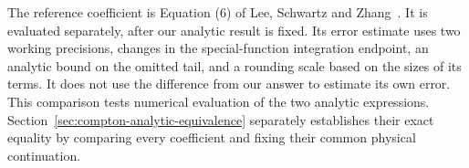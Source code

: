 The reference coefficient is Equation (6) of Lee, Schwartz and
Zhang~\cite{qed-processes-lsz}. It is evaluated separately, after
our analytic result is fixed. Its error estimate uses two working
precisions, changes in the special-function integration endpoint,
an analytic bound on the omitted tail, and a rounding scale based
on the sizes of its terms. It does not use the difference from our
answer to estimate its own error. This comparison tests numerical evaluation of the two analytic
expressions. Section~\ref{sec:compton-analytic-equivalence} separately
establishes their exact equality by comparing every coefficient and
fixing their common physical continuation.


